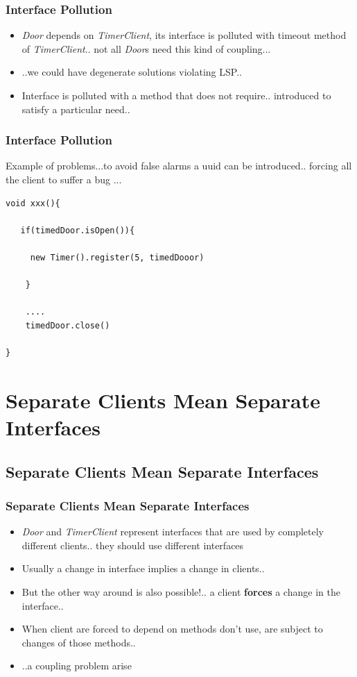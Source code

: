 \documentclass{beamer}
\begin{document}
\begin{frame}
  \frametitle{Interface Pollution}
  \begin{itemize}
	\item<+-> \textit{Door} depends on \textit{TimerClient}, its interface is polluted with timeout method of \textit{TimerClient}.. not all \textit{Door}s need this kind of coupling... 
	\item<+-> ..we could have degenerate solutions violating LSP..\\
	\item<+-> Interface is polluted with a method that does not require.. introduced to satisfy a particular need..
   \end{itemize}
\end{frame}

\begin{frame}[containsverbatim]
	\frametitle{Interface Pollution}
	Example of problems...to avoid false alarms a uuid can be introduced.. forcing all the client to suffer a bug ... \\
	\begin{lstlisting}
void xxx(){
   
   if(timedDoor.isOpen()){
    
     new Timer().register(5, timedDooor)

    }

    ....
    timedDoor.close()

}
	\end{lstlisting}
\end{frame}

\section{Separate Clients Mean Separate Interfaces}
\subsection{Separate Clients Mean Separate Interfaces}
\begin{frame}
  \frametitle{Separate Clients Mean Separate Interfaces}
  \begin{itemize}
	\item<+-> \textit{Door} and \textit{TimerClient} represent interfaces that are used by completely different clients.. they should use different interfaces 
	\item<+-> Usually a change in interface implies a change in clients..
	\item<+-> But the other way around is also possible!.. a client \textbf{forces} a change in the interface..
	\item<+-> When client are forced to depend on methods don't use, are subject to changes of those methods..
	\item<+-> ..a coupling problem arise
   \end{itemize}
\end{frame}
\end{document}
